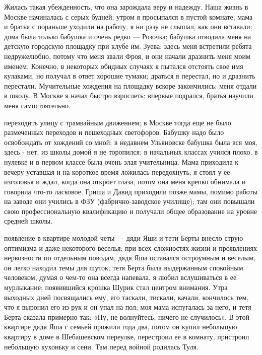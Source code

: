 \label{150-1}
Жилась такая убежденность, что она зарождала веру и надежду. Наша жизнь в Москве начиналась с серых будней; утром я просыпался в пустой комнате; мама и братья с пораньше уходили на работу, я ни разу не слышал, как они вставали; дома была только бабушка и очень редко — Розочка; бабушка отводила меня на детскую городскую площадку при клубе им. Зуева; здесь меня встретили ребята недружелюбно, потому что меня звали Фроя, и они начали дразнить меня моим именем. Конечно, в некоторых обидных случаях я пытался отстоять свое имя кулаками, но получал в ответ хорошие тумаки; драться я перестал, но и дразнить перестали. Мучительные хождения на площадку вскоре закончились: меня отдали в школу. В Москве я начал быстро взрослеть: впервые подрался, братья научили меня самостоятельно.

\label{151-1}
переходить улицу с трамвайным движением; в Москве тогда еще не было размеченных переходов и пешеходных светофоров. Бабушку надо было освобождать от хождений со мной; в недавнем Ульяновске бабушка была вся моя, здесь - нет, из школы домой я не торопился; в начальных классах учился плохо, в нулевке и в первом классе была очень злая учительница. Мама приходила к вечеру уставшая и на короткое время ложилась передохнуть; я стоял у ее изголовья и ждал, когда она откроет глаза, потом она меня крепко обнимала и говорила что-то ласковое. Гриша и Давид приходили позже мамы, помимо работы на заводе они учились в ФЗУ (фабрично-заводское училище); там они повышали свою профессиональную квалификацию и получали общее образование на уровне средней школы.

\label{152-1}
появление в квартире молодой четы — дяди Яши и тети Берты внесло струю оптимизма и даже некоторого веселья; при всех сложностях жизни и проявлениях нервозности по отдельным поводам, дядя Яша оставался остроумным и веселым, он легко находил темы для шуток; тетя Берта была выдержанным спокойным человеком, думая о чем-то она всегда напевала, я любил вслушиваться в ее мурлыкание; появившийся крошка Шурик стал центром внимания. Утра выходных дней посвящались ему, его таскали, тискали, качали, кончилось тем, что я выронил его из рук и он упал на пол; моя мама испугалась за него, и тетя Берта сказала примерно так: «Ну, не волнуйтесь, ничего не случилось». В этой квартире дядя Яша с семьей прожили года два, потом он купил небольшую квартиру в доме в Шебашевском переулке, перестроил ее в комнату, пристроил небольшую кухоньку и сени. Там перед войной родилась Туля.

